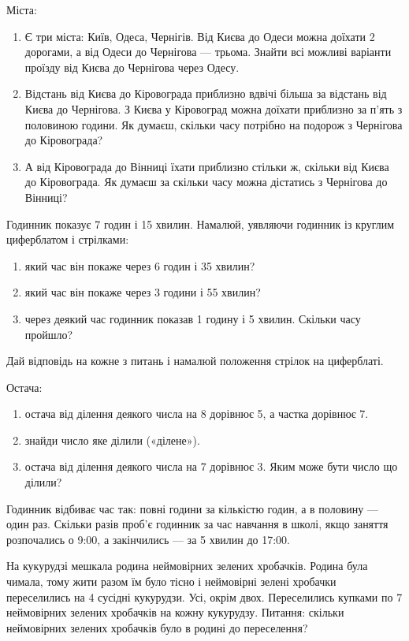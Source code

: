 \problem
Міста:
\begin{enumerate}
    \item Є три міста: Київ, Одеса, Чернігів.
    Від Києва до Одеси можна доїхати 2 дорогами,
    а від Одеси до Чернігова --- трьома.
    Знайти всі можливі варіанти проїзду від Києва до Чернігова через Одесу.
    \item Відстань від Києва до Кіровограда приблизно вдвічі більша
    за відстань від Києва до Чернігова.
    З Києва у Кіровоград можна доїхати приблизно за п'ять з половиною години.
    Як думаєш, скільки часу потрібно на подорож з Чернігова до Кіровограда?
    \item А від Кіровограда до Вінниці їхати приблизно стільки ж,
    скільки від Києва до Кіровограда.
    Як думаєш за скільки часу можна дістатись з Чернігова до Вінниці?
\end{enumerate}


\problem
Годинник показує 7 годин і 15 хвилин.
Намалюй, уявляючи годинник із круглим циферблатом і стрілками:
\begin{enumerate}
    \item який час він покаже через 6 годин і 35 хвилин?
    \item який час він покаже через 3 години і 55 хвилин?
    \item через деякий час годинник показав 1 годину і 5 хвилин.
    Скільки часу пройшло?
\end{enumerate}
Дай відповідь на кожне з питань і намалюй положення стрілок на циферблаті.


\problem
Остача:
\begin{enumerate}
    \item остача від ділення деякого числа на 8 дорівнює 5,
    а частка дорівнює 7.
    \item знайди число яке ділили («ділене»).
    \item остача від ділення деякого числа на 7 дорівнює 3.
    Яким може бути число що ділили?
\end{enumerate}


\problem
Годинник відбиває час так: повні години за кількістю годин,
а в половину --- один раз.
Скільки разів проб’є годинник за час навчання в школі,
якщо заняття розпочались о 9:00, а закінчились --- за 5 хвилин до 17:00.


\problem
На кукурудзі мешкала родина неймовірних зелених хробачків.
Родина була чимала, тому жити разом їм було тісно і неймовірні
зелені хробачки переселились на 4 сусідні кукурудзи. Усі, окрім двох.
Переселились купками по 7 неймовірних зелених хробачків на кожну кукурудзу.
Питання: скільки неймовірних зелених хробачків було в родині до переселення?


